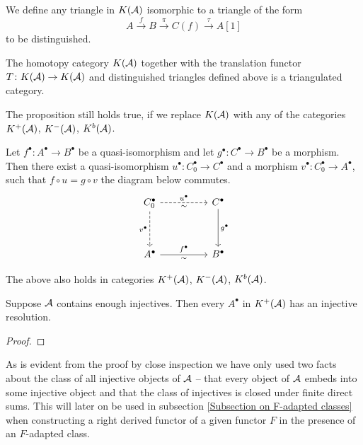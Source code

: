 We define any triangle in $K(\mathcal A)$ isomorphic to a triangle of the form
\[
    A \xrightarrow{ \ f \ }  B \xrightarrow{\ \pi \ } C(f) \xrightarrow{\ \tau \ } A[1]
\]
to be distinguished.

\begin{proposition}
    The homotopy category $K(\mathcal A)$ together with the translation functor $T\colon K(\mathcal A) \to K(\mathcal A)$ and distinguished triangles defined above is a triangulated category.
\end{proposition}

\begin{remark}
    The proposition still holds true, if we replace $K(\mathcal A)$ with any of the categories $K^+(\mathcal A)$, $K^-(\mathcal A)$, $K^b(\mathcal A)$.
\end{remark}


\newpage
\begin{lemma}
    Let $f^\bullet \colon A^\bullet \to B^\bullet$ be a quasi-isomorphism and let $g^\bullet\colon C^\bullet \to B^\bullet$ be a morphism. Then there exist a quasi-isomorphism $u^\bullet\colon C_0^\bullet \to C^\bullet$ and a morphism $v^\bullet\colon C_0^\bullet \to A^\bullet$, such that $f \circ u = g \circ v$ \ie the diagram below commutes.
    \[
    \begin{tikzcd}
        {C_0^\bullet} && C^\bullet \\
        \\
        A^\bullet && B^\bullet
        \arrow["u^\bullet", dashed, from=1-1, to=1-3]
        \arrow["\sim"', draw=none, from=1-1, to=1-3]
        \arrow["v^\bullet"', dashed, from=1-1, to=3-1]
        \arrow["g^\bullet", from=1-3, to=3-3]
        \arrow["f^\bullet", from=3-1, to=3-3]
        \arrow["\sim"', draw=none, from=3-1, to=3-3]
    \end{tikzcd}
    \]
\end{lemma}

The above also holds in categories $K^+(\mathcal A)$, $K^-(\mathcal A)$, $K^b(\mathcal A)$.

\begin{proposition}
    \label{injective resolution}
    Suppose $\mathcal A$ contains enough injectives. Then every $A^\bullet$ in $K^+(\mathcal A)$ has an injective resolution.
\end{proposition}

\begin{proof}
    
\end{proof}

\begin{remark}
    As is evident from the proof by close inspection we have only used two facts about the class of all injective objects of $\mathcal A$ -- that every object of $\mathcal A$ embeds into some injective object and that the class of injectives is closed under finite direct sums. This will later on be used in subsection \ref{Subsection on F-adapted classes} when constructing a right derived functor of a given functor $F$ in the presence of an $F$-adapted class.
\end{remark}

